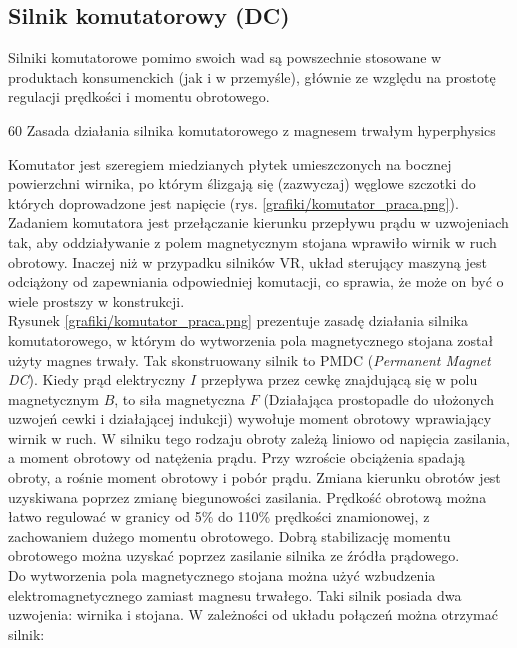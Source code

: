 \subsection{Silnik komutatorowy (DC)}

Silniki komutatorowe pomimo swoich wad są powszechnie stosowane w produktach konsumenckich (jak i w przemyśle), głównie ze względu na prostotę regulacji prędkości i momentu obrotowego. 

		{60}
		{Zasada działania silnika komutatorowego z magnesem trwałym}
		{hyperphysics}

Komutator jest szeregiem miedzianych płytek umieszczonych na bocznej powierzchni wirnika, po którym ślizgają się (zazwyczaj) węglowe szczotki do których doprowadzone jest napięcie (rys. \ref{grafiki/komutator_praca.png}). Zadaniem komutatora jest przełączanie kierunku przepływu prądu w uzwojeniach tak, aby oddziaływanie z polem magnetycznym stojana wprawiło wirnik w ruch obrotowy. Inaczej niż w przypadku silników VR, układ sterujący maszyną jest odciążony od zapewniania odpowiedniej komutacji, co sprawia, że może on być o wiele prostszy w konstrukcji. \\

Rysunek \ref{grafiki/komutator_praca.png} prezentuje zasadę działania silnika komutatorowego, w którym do wytworzenia pola magnetycznego stojana został użyty magnes trwały. Tak skonstruowany silnik to PMDC ({\it Permanent Magnet DC}). Kiedy prąd elektryczny $ I $ przepływa przez cewkę znajdującą się w polu magnetycznym $ B $, to siła magnetyczna $ F $ (Działająca prostopadle do ułożonych uzwojeń cewki i działającej indukcji)  wywołuje moment obrotowy wprawiający wirnik w ruch. W silniku tego rodzaju obroty zależą liniowo od napięcia zasilania, a moment obrotowy od natężenia prądu. Przy wzroście obciążenia spadają obroty, a rośnie moment obrotowy i pobór prądu. Zmiana kierunku obrotów jest uzyskiwana poprzez zmianę biegunowości zasilania. Prędkość obrotową można łatwo regulować w granicy od 5\% do 110\% prędkości znamionowej, z zachowaniem dużego momentu obrotowego. Dobrą stabilizację momentu obrotowego można uzyskać poprzez zasilanie silnika ze źródła prądowego. \\

Do wytworzenia pola magnetycznego stojana można użyć wzbudzenia elektromagnetycznego zamiast magnesu trwałego. Taki silnik posiada dwa uzwojenia: wirnika i stojana. W zależności od układu połączeń można otrzymać silnik:

